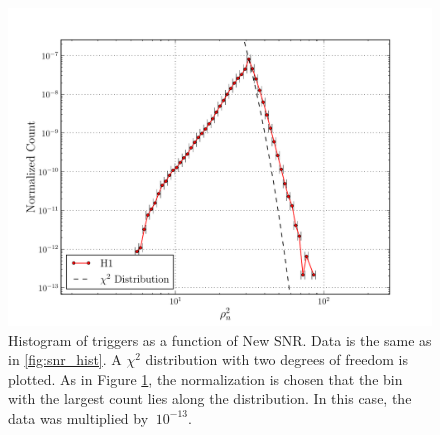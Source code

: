 \begin{figure}
\center
\includegraphics[width=6in]{figures/H1-newsnr_hist_cat1_veto.pdf}
\caption{Histogram of triggers as a function of New SNR. Data is the same as in \ref{fig:snr_hist}. A $\chi^2$ distribution with two degrees of freedom is plotted. As in Figure \ref{fig:newsnr_hist}, the normalization is chosen that the bin with the largest count lies along the distribution. In this case, the data was multiplied by $~10^{-13}$.}
\label{fig:newsnr_hist}
\end{figure}
